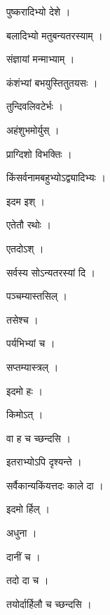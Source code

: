 \documentclass[10pt, openany]{book}
\begin{document}
\noindent पुष्करादिभ्यो देशे ।

\noindent बलादिभ्यो मतुबन्यतरस्याम् ।

\noindent संज्ञायां मन्माभ्याम् ।

\noindent कंशंभ्यां बभयुस्तितुतयसः ।

\noindent तुन्दिवलिवटेर्भः ।

\noindent अहंशुभमोर्युस् ।

\noindent प्राग्दिशो विभक्तिः ।

\noindent किंसर्वनामबहुभ्योऽद्व्यादिभ्यः ।

\noindent इदम इश् ।

\noindent एतेतौ रथोः ।

\noindent एतदोऽश् ।

\noindent सर्वस्य सोऽन्यतरस्यां दि ।

\noindent पञ्चम्यास्तसिल् ।

\noindent तसेश्च ।

\noindent पर्यभिभ्यां च ।

\noindent सप्तम्यास्त्रल् ।

\noindent इदमो हः ।

\noindent किमोऽत् ।

\noindent वा ह च च्छन्दसि ।

\noindent इतराभ्योऽपि दृश्यन्ते ।

\noindent सर्वैकान्यकिंयत्तदः काले दा ।

\noindent इदमो र्हिल् ।

\noindent अधुना ।

\noindent दानीं च ।

\noindent तदो दा च ।

\noindent तयोर्दार्हिलौ च च्छन्दसि ।
\end{document}
